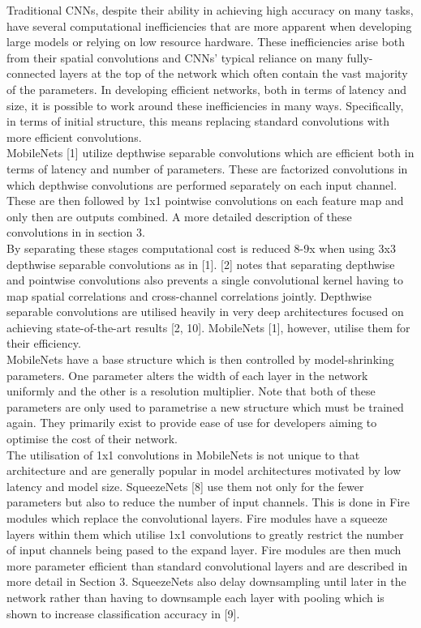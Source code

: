 \documentclass{article}
\begin{document}
Traditional CNNs, despite their ability in achieving high accuracy on many tasks, have several computational inefficiencies that are more apparent when developing large models or relying on low resource hardware. These inefficiencies  arise both from their spatial convolutions and CNNs' typical reliance on many fully-connected layers at the top of the network which often contain the vast majority of the parameters. In developing efficient networks, both in terms of latency and size, it is possible to work around these inefficiencies in many ways. Specifically, in terms of initial structure, this means replacing standard convolutions with more efficient convolutions.\\

MobileNets [1] utilize depthwise separable convolutions which are efficient both in terms of latency  and number of parameters. These are factorized convolutions in which depthwise convolutions are performed separately on each input channel. These are then followed by 1x1 pointwise convolutions on each feature map and only then are outputs combined. A more detailed description of these convolutions in in section 3.\\ 

By separating these stages computational cost is reduced 8-9x when using 3x3 depthwise separable convolutions as in [1]. [2] notes that separating depthwise and pointwise convolutions also prevents a single convolutional kernel having to map spatial correlations and cross-channel correlations jointly. Depthwise separable convolutions are utilised heavily in very deep architectures focused on achieving state-of-the-art results [2, 10]. MobileNets [1], however, utilise them for their efficiency. \\

MobileNets have a base structure which is then controlled by model-shrinking parameters. One parameter alters the width of each layer in the network uniformly and the other is a resolution multiplier. Note that both of these parameters are only used to parametrise a new structure which must be trained again. They primarily exist to provide ease of use for developers aiming to optimise the cost of their network.\\

The utilisation of 1x1 convolutions in MobileNets is not unique to that architecture and are generally popular in model architectures motivated by low latency and model size. SqueezeNets [8] use them not only for the fewer parameters but also to reduce the number of input channels. This is done in Fire modules which replace the convolutional layers. Fire modules have a squeeze layers within them which utilise 1x1 convolutions to greatly restrict the number of input channels being pased to the expand layer. Fire modules are then much more parameter efficient than standard convolutional layers and are described in more detail in Section 3. SqueezeNets also delay downsampling until later in the network rather than having to downsample each layer with pooling which is shown to increase classification accuracy in [9].\\
\end{document}

